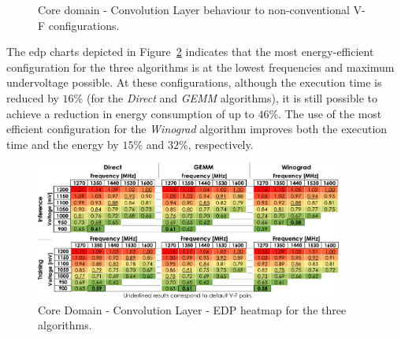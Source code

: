 \begin{figure}[htb]
  \begin{subfigmatrix}{2}
  \end{subfigmatrix}
  \caption{Core domain - Convolution Layer behaviour to non-conventional V-F configurations.}
  \label{fig:Convolution_behaviour}
\end{figure}

The \acrshort{edp} charts depicted in Figure~\ref{fig:Convolution_EDP} indicates that the most energy-efficient configuration for the three algorithms is at the lowest frequencies and maximum undervoltage possible. At these configurations, although the execution time is reduced by $16\%$ (for the \textit{Direct} and \textit{GEMM} algorithms), it is still possible to achieve a reduction in energy consumption of up to $46\%$. The use of the most efficient configuration for the \textit{Winograd} algorithm improves both the execution time and the energy by $15\%$ and $32\%$, respectively.

\begin{figure}[htbp]
    \centering
        \includegraphics[width=0.9\textwidth]{Figures/Application To Deep Learning/Convolution_EDP.pdf}
        \caption{Core Domain - Convolution Layer - EDP heatmap for the three algorithms.}
    \label{fig:Convolution_EDP}
\end{figure}



